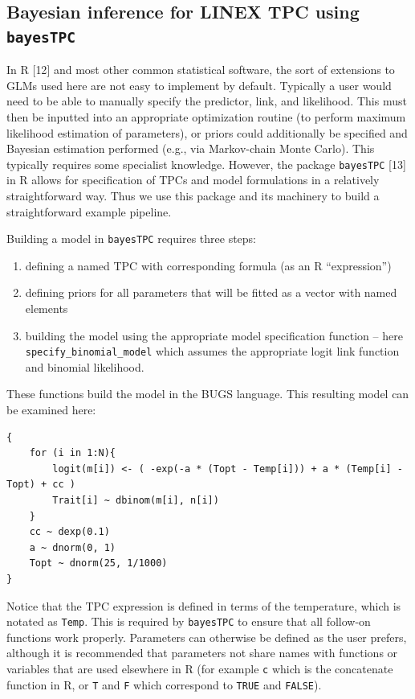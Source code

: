 \documentclass[
  11pt,
  letterpaper,
]{article}
\providecommand{\tightlist}{%
  \setlength{\itemsep}{0pt}\setlength{\parskip}{0pt}}
\begin{document}
\subsection{\texorpdfstring{Bayesian inference for LINEX TPC using
\texttt{bayesTPC}}{Bayesian inference for LINEX TPC using bayesTPC}}\label{bayesian-inference-for-linex-tpc-using-bayestpc}

In R {[}12{]} and most other common statistical software, the sort of
extensions to GLMs used here are not easy to implement by default.
Typically a user would need to be able to manually specify the
predictor, link, and likelihood. This must then be inputted into an
appropriate optimization routine (to perform maximum likelihood
estimation of parameters), or priors could additionally be specified and
Bayesian estimation performed (e.g., via Markov-chain Monte Carlo). This
typically requires some specialist knowledge. However, the package
\texttt{bayesTPC} {[}13{]} in R allows for specification of TPCs and
model formulations in a relatively straightforward way. Thus we use this
package and its machinery to build a straightforward example pipeline.

Building a model in \texttt{bayesTPC} requires three steps:

\begin{enumerate}
\def\labelenumi{\arabic{enumi})}
\tightlist
\item
  defining a named TPC with corresponding formula (as an R
  ``expression'')
\item
  defining priors for all parameters that will be fitted as a vector
  with named elements
\item
  building the model using the appropriate model specification function
  -- here \texttt{specify\_binomial\_model} which assumes the
  appropriate logit link function and binomial likelihood.
\end{enumerate}

These functions build the model in the BUGS language. This resulting
model can be examined here:

\begin{verbatim}
{
    for (i in 1:N){
        logit(m[i]) <- ( -exp(-a * (Topt - Temp[i])) + a * (Temp[i] - Topt) + cc )
        Trait[i] ~ dbinom(m[i], n[i])
    }
    cc ~ dexp(0.1)
    a ~ dnorm(0, 1)
    Topt ~ dnorm(25, 1/1000)
}
\end{verbatim}

Notice that the TPC expression is defined in terms of the temperature,
which is notated as \texttt{Temp}. This is required by \texttt{bayesTPC}
to ensure that all follow-on functions work properly. Parameters can
otherwise be defined as the user prefers, although it is recommended
that parameters not share names with functions or variables that are
used elsewhere in R (for example \texttt{c} which is the concatenate
function in R, or \texttt{T} and \texttt{F} which correspond to
\texttt{TRUE} and \texttt{FALSE}).
\end{document}
